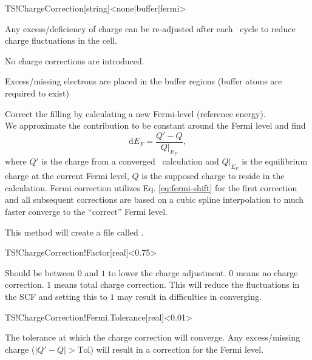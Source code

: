 \begin{fdfentry}{TS!ChargeCorrection}[string]<none|buffer|fermi>

  Any excess/deficiency of charge can be re-adjusted after each
  \tsiesta\ cycle to reduce charge fluctuations in the cell.
  
  \begin{fdfoptions}

    \option[none]%
    No charge corrections are introduced.

    \option[buffer]%
    Excess/missing electrons are placed in the buffer regions (buffer
    atoms are required to exist)

    \option[fermi] %
    Correct the filling by calculating a new Fermi-level (reference energy). \\
    We approximate the contribution to be constant around the Fermi
    level and find
    \begin{equation}
      \label{eq:fermi-shift}
      \mathrm{d}E_F = \frac{Q'-Q}{Q|_{E_F}},
    \end{equation}
    where $Q'$ is the charge from a converged \tsiesta\ calculation
    and $Q|_{E_F}$ is the equilibrium charge at the current Fermi
    level, $Q$ is the supposed charge to reside in the
    calculation. Fermi correction utilizes Eq. \eqref{eq:fermi-shift} for
    the first correction and all subsequent corrections are based on a
    cubic spline interpolation to much faster converge to the
    ``correct'' Fermi level.
    
    This method will create a file called .
    
  \end{fdfoptions}

\end{fdfentry}

\begin{fdfentry}{TS!ChargeCorrection!Factor}[real]<0.75>

  Should be between $0$ and $1$ to lower the charge adjustment. $0$
  means no charge correction. $1$ means total charge correction. This
  will reduce the fluctuations in the SCF and setting this to $1$ may
  result in difficulties in converging.
  
\end{fdfentry}

\begin{fdfentry}{TS!ChargeCorrection!Fermi.Tolerance}[real]<0.01>

  The tolerance at which the charge correction will converge. Any
  excess/missing charge ($|Q'-Q|>\mathrm{Tol}$) will result in a
  correction for the Fermi level.
  
\end{fdfentry}

